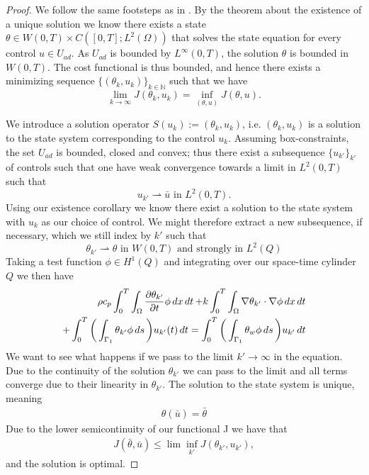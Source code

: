 \begin{proof}
We follow the same footsteps as in \cite{DPSteel}. By the theorem about the existence of a unique solution we know there exists a state $\theta \in W(0,T) \times C([0,T];L^2(\Omega))$ that solves the state equation for every control $u \in U_{ad}$. As $U_{ad}$ is bounded by $L^{\infty}(0,T)$, the solution $\theta$ is bounded in $W(0,T)$. The cost functional is thus bounded, and hence there exists a minimizing sequence $\{(\theta_k,u_k)\}_{k\in \mathbb{N}}$ such that we have 
\begin{equation*}
    \lim_{k \to \infty}J(\theta_k,u_k) = \inf_{(\theta,u)}J(\theta,u).
\end{equation*}

We introduce a solution operator $S(u_k):= (\theta_k, u_k)$, i.e. $(\theta_k,u_k)$ is a solution to the state system corresponding to the control $u_k$. Assuming box-constraints, the set $U_{ad}$ is bounded, closed and convex; thus there exist a subsequence $\{u_{k'} \}_{k'}$ of controls such that one have weak convergence towards a limit in $L^2(0,T)$ such that
\begin{equation*}
    u_{k'} \rightharpoonup \bar{u} \text{ in } L^2(0,T).
\end{equation*}
Using our existence corollary we know there exist a solution to the state system with $u_k$ as our choice of control. We might therefore extract a new subsequence, if necessary, which we still index by $k'$ such that
\begin{equation*}
    \theta_{k'} \rightharpoonup \theta \text{ in } W(0,T) \text{ and strongly in } L^2(Q)
\end{equation*}
Taking a test function $\phi \in H^1(Q)$ and integrating over our space-time cylinder $Q$ we then have 
\begin{align*}
    \rho c_p \int_0^T\int_{\Omega}\frac{\partial \theta_{k'}}{\partial t}\phi \mathop{dx}\mathop{dt} + k \int_0^T \int_{\Omega}\nabla \theta_{k'} \cdot \nabla \phi \mathop{dx}\mathop{dt} \\ + \int_0^T \bigg (\int_{\Gamma_1}\theta_{k'}\phi \mathop{ds} \bigg )u_{k'}(t) \mathop{dt} =
    \int_0^T \bigg (\int_{\Gamma_1}\theta_w\phi \mathop{ds} \bigg ) u_{k'} \mathop{dt} 
\end{align*}
We want to see what happens if we pass to the limit $k' \rightarrow \infty$ in the equation. Due to the continuity of the solution $\theta_{k'}$ we can pass to the limit and all terms converge due to their linearity in $\theta_{k'}$. The solution to the state system is unique, meaning
\begin{align*}
    \theta(\bar{u}) = \bar{\theta} 
\end{align*}
Due to the lower semicontinuity of our functional J we have that 
\begin{align*}
    J(\bar{\theta}, \bar{u}) \leq \lim \inf_{k'} J(\theta_{k'}, u_{k'}),
\end{align*}
and the solution is optimal. 
\end{proof}